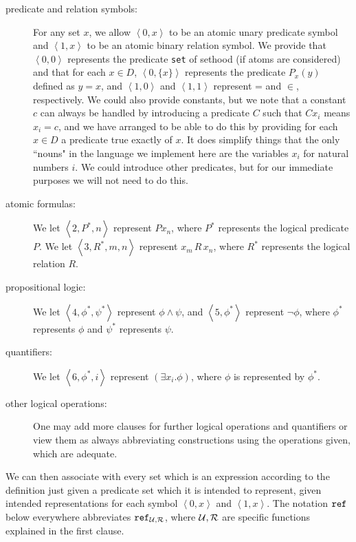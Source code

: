 \documentclass[12pt]{book}
\begin{document}
\begin{description}

\item[predicate and relation symbols:]  For any set $x$, we allow $\left<0,x\right>$ to be an atomic unary predicate symbol and $\left<1,x\right>$ to be an atomic binary relation symbol.  We provide that $\left<0,0\right>$ represents the predicate {\tt set} of sethood (if atoms are considered) and that for each $x \in D$,  $\left<0,\{x\}\right>$ represents the predicate $P_x(y)$ defined as $y=x$, and $\left<1,0\right>$ and $\left<1,1\right>$ represent = and $\in$, respectively.   We could also provide constants, but we note that a constant $c$ can always be handled by introducing a predicate $C$ such that $Cx_i$ means $x_i=c$, and we have arranged to be able to do this by providing for each $x \in D$ a predicate true exactly of $x$.  It does simplify things that the only ``nouns" in the language we implement here are the variables $x_i$ for natural numbers $i$.  We could introduce other predicates, but for our immediate purposes we will not need to do this.

\item[atomic formulas:]  We let $\left<2,P^*,n\right>$ represent $Px_n$, where $P^*$ represents the logical predicate $P$.  We let $\left<3,R^*,m,n\right>$ represent
$x_m \,R \,x_n$, where $R^*$ represents the logical relation $R$.

\item[propositional logic:]  We let $\left<4,\phi^*,\psi^*\right>$ represent $\phi \wedge \psi$, and $\left<5,\phi^*\right>$ represent $\neg\phi$, where $\phi^*$ represents
$\phi$ and $\psi^*$ represents $\psi$.

\item[quantifiers:]  We let $\left<6,\phi^*,i\right>$ represent $(\exists x_i.\phi)$, where $\phi$ is represented by $\phi^*$.

\item[other logical operations:]  One may add more clauses for further logical operations and quantifiers or view them as always abbreviating constructions using the operations given, which are adequate.

\end{description}

We can then associate with every set which is an expression according to the definition just given a predicate set which it is intended to represent, given intended representations for
each symbol $\left<0,x\right>$ and $\left<1,x\right>$.  The notation ${\tt ref}$ below everywhere abbreviates ${\tt ref}_{\cal U,R}$, where $\cal U, R$ are specific functions explained in the first clause.
\end{document}

